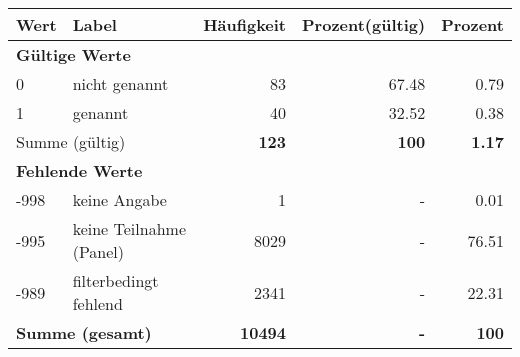      \begin{longtable}{lXrrr}
     \toprule
     \textbf{Wert} & \textbf{Label} & \textbf{Häufigkeit} & \textbf{Prozent(gültig)} & \textbf{Prozent} \\
     \endhead
     \midrule
     \multicolumn{5}{l}{\textbf{Gültige Werte}}\\

     0 &
     \multicolumn{1}{X}{ nicht genannt   } &


       \num{83} &
       \num[round-mode=places,round-precision=2]{67.48} &
         \num[round-mode=places,round-precision=2]{0.79} \\

     1 &
     \multicolumn{1}{X}{ genannt   } &


       \num{40} &
       \num[round-mode=places,round-precision=2]{32.52} &
         \num[round-mode=places,round-precision=2]{0.38} \\
     \midrule
     \multicolumn{2}{l}{Summe (gültig)} &
       \textbf{\num{123}} &
     \textbf{\num{100}} &
       \textbf{\num[round-mode=places,round-precision=2]{1.17}} \\
     \multicolumn{5}{l}{\textbf{Fehlende Werte}}\\
       -998 &
       keine Angabe &
         \num{1} &
        - &
         \num[round-mode=places,round-precision=2]{0.01} \\
       -995 &
       keine Teilnahme (Panel) &
         \num{8029} &
        - &
         \num[round-mode=places,round-precision=2]{76.51} \\
       -989 &
       filterbedingt fehlend &
         \num{2341} &
        - &
         \num[round-mode=places,round-precision=2]{22.31} \\
     \midrule
     \multicolumn{2}{l}{\textbf{Summe (gesamt)}} &
          \textbf{\num{10494}} &
        \textbf{-} &
        \textbf{\num{100}} \\
     \bottomrule
     \end{longtable}
     
